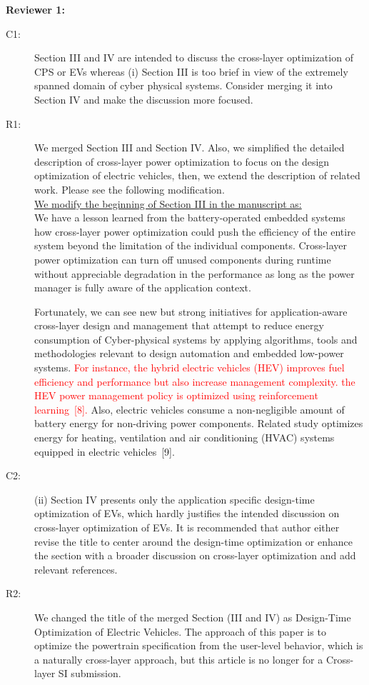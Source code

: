 \documentclass[onecolumn]{IEEEconf}
\begin{document}
\setlength{\parindent}{0cm}
\textbf{Reviewer 1:}
\begin{description}
\item [C1: ] Section III and IV are intended to discuss the cross-layer optimization of CPS or EVs whereas (i) Section III is too brief in view of the extremely spanned domain of cyber physical systems. Consider merging it into Section IV and make the discussion more focused.  
\item [R1: ] We merged Section III and Section IV. Also, we simplified the detailed description of cross-layer power optimization to focus on the design optimization of electric vehicles, then, we extend the description of related work. Please see the following modification.\\

\underline{We modify the beginning of Section III in the manuscript as:}\\
We have a lesson learned from the battery-operated embedded systems how cross-layer power optimization could push the efficiency of the entire system beyond the limitation of the individual components. Cross-layer power optimization can turn off unused components during runtime without appreciable degradation in the performance as long as the power manager is fully aware of the application context. 

Fortunately, we can see new but strong initiatives for application-aware cross-layer design and management that attempt to reduce energy consumption of Cyber-physical systems by applying algorithms, tools and methodologies relevant to design automation and embedded low-power systems. 
\textcolor{red}{For instance, the hybrid electric vehicles (HEV) improves fuel efficiency and performance but also increase management complexity. the HEV power management policy is optimized using reinforcement learning~[8].} Also, electric vehicles consume a non-negligible amount of battery energy for non-driving power components. Related study optimizes energy for heating, ventilation and air conditioning (HVAC) systems equipped in electric vehicles~[9].
~\\

\item [C2: ] (ii) Section IV presents only the application specific design-time optimization of EVs, which hardly justifies the intended discussion on cross-layer optimization of EVs. It is recommended that author either revise the title to center around the design-time optimization or enhance the section with a broader discussion on cross-layer optimization and add relevant references.
\item [R2: ]  We changed the title of the merged Section (III and IV) as Design-Time Optimization of Electric Vehicles. The approach of this paper is to optimize the powertrain specification from the user-level behavior, which is a naturally cross-layer approach, but this article is no longer for a Cross-layer SI submission.
~\\


\end{description}
\end{document}
